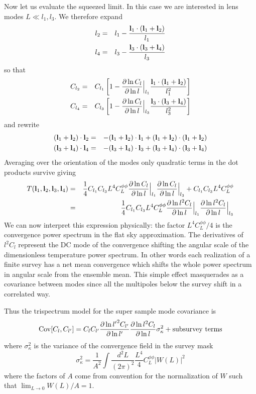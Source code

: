 \documentclass[11pt]{article}
\newcommand{\bl}{{\bf l}}
\begin{document}
Now let us evaluate the squeezed limit. In this case we are interested in lens modes
$L\ll l_1, l_3$.    We therefore expand
\begin{eqnarray}
l_2 &= & l_1 - \frac{\bl_1\cdot (\bl_1+\bl_2)}{l_1} \nonumber\\
l_4 &= & l_3 - \frac{\bl_3 \cdot (\bl_3+\bl_4)}{l_3} 
\end{eqnarray}
so that
\begin{eqnarray}
C_{l_2} &= & C_{l_1}\left[ 1-  \frac{\partial \ln C_l }{\partial \ln l} \Big|_{l_1} \frac{\bl_1\cdot (\bl_1+\bl_2)}{l_1^2}\right] \nonumber\\
C_{l_4} &= & C_{l_3}\left[ 1-  \frac{\partial \ln C_l }{\partial \ln l} \Big|_{l_3}  \frac{\bl_3 \cdot (\bl_3+\bl_4)}{l_3^2 } \right] \nonumber\\
\end{eqnarray} 
and rewrite
\begin{eqnarray}
(\bl_1+\bl_2)\cdot \bl_2& =& -(\bl_1+\bl_2)\cdot \bl_1+  (\bl_1+\bl_2)\cdot  (\bl_1+\bl_2) \nonumber\\
(\bl_3+\bl_4)\cdot \bl_4 &= &-(\bl_3+\bl_4)\cdot \bl_3+  (\bl_3+\bl_4)\cdot  (\bl_3+\bl_4) 
\end{eqnarray}
Averaging over the orientation of the modes only quadratic terms in the dot products
survive giving
\begin{eqnarray}
T(\bl_1,\bl_2,\bl_3,\bl_4) & =& \frac{1}{4} C_{l_1} C_{l_3} L^4 C^{\phi\phi}_{L}  \frac{\partial \ln C_l }{\partial \ln l}\Big|_{l_1} \frac{\partial \ln C_l }{\partial \ln l} \Big|_{l_3}  +
C_{l_1} C_{l_3} L^4 C^{\phi\phi}_{L} \nonumber\\
&=& \frac{1}{4} C_{l_1} C_{l_3} L^4 C^{\phi\phi}_{L}  \frac{\partial \ln l^2 C_l }{\partial \ln l}\Big|_{l_1} \frac{\partial \ln l^2 C_l }{\partial \ln l} \Big|_{l_3} 
\end{eqnarray}
We can now interpret this expression physically:  the factor $L^4 C_L^{\phi\phi}/4$ is the 
convergence power spectrum in the flat sky approximation.   The derivatives of $l^2 C_l$ 
represent the DC mode of the convergence shifting the angular scale of the dimensionless
temperature power spectrum.  In other words each realization of a finite survey has a net
mean convergence which shifts the whole power spectrum in angular scale from the ensemble mean.   
This simple effect masquerades as a covariance between modes since all the multipoles
below the survey shift in a correlated way.

Thus the trispectrum model for the super sample mode covariance is
\begin{equation}
{\rm Cov}[{C_{l},C_{l'} }] = C_{l} C_{l' }  \frac{\partial \ln {l'}^2 C_{l'} }{\partial \ln l'} \frac{\partial \ln l^2 C_l }{\partial \ln l} \sigma_\kappa^2  + {\rm subsurvey\ terms}
\end{equation}
where $\sigma_\kappa^2$ is the variance of the convergence field in the survey mask
\begin{equation}
\sigma_\kappa^2 =\frac{1}{A^2} \int \frac{d^2 L}{(2\pi)^2} \frac{L^4}{4} C_L^{\phi\phi} |W(L)|^2
\end{equation}
where the factors of $A$ come from convention for the normalization of $W$ such that $\lim_{L\rightarrow 0} W(L)/A = 1$.
\end{document}
